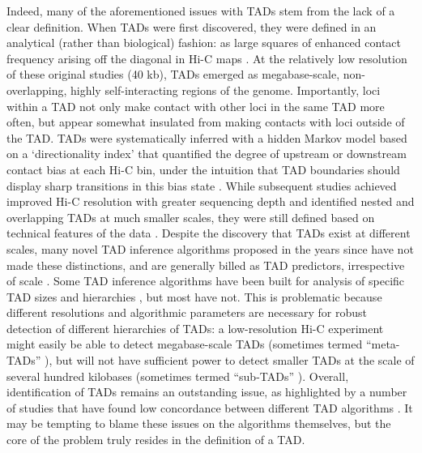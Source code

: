 Indeed, many of the aforementioned issues with TADs stem from the lack of a clear definition. When TADs were first discovered, they were defined in an analytical (rather than biological) fashion: as large squares of enhanced contact frequency arising off the diagonal in Hi-C maps \cite{Dixon.2012, Nora.2012, Hou.2012, Sexton.2012}. At the relatively low resolution of these original studies (40 kb), TADs emerged as megabase-scale, non-overlapping, highly self-interacting regions of the genome. Importantly, loci within a TAD not only make contact with other loci in the same TAD more often, but appear somewhat insulated from making contacts with loci outside of the TAD. TADs were systematically inferred with a hidden Markov model based on a `directionality index' that quantified the degree of upstream or downstream contact bias at each Hi-C bin, under the intuition that TAD boundaries should display sharp transitions in this bias state \cite{Dixon.2012}. While subsequent studies achieved improved Hi-C resolution with greater sequencing depth and identified nested and overlapping TADs at much smaller scales, they were still defined based on technical features of the data \cite{Rao.2014}. Despite the discovery that TADs exist at different scales, many novel TAD inference algorithms proposed in the years since have not made these distinctions, and are generally billed as TAD predictors, irrespective of scale \cite{Dali.2017}. Some TAD inference algorithms have been built for analysis of specific TAD sizes and hierarchies \cite{Rao.2014, Weinreb.2016}, but most have not. This is problematic because different resolutions and algorithmic parameters are necessary for robust detection of different hierarchies of TADs: a low-resolution Hi-C experiment might easily be able to detect megabase-scale TADs (sometimes termed ``meta-TADs'' \cite{Fraser.2015a}), but will not have sufficient power to detect smaller TADs at the scale of several hundred kilobases (sometimes termed ``sub-TADs'' \cite{Phillips-Cremins.2013}). Overall, identification of TADs remains an outstanding issue, as highlighted by a number of studies that have found low concordance between different TAD algorithms \cite{Dali.2017, Zufferey.2018, Forcato.2017}. It may be tempting to blame these issues on the algorithms themselves, but the core of the problem truly resides in the definition of a TAD.

